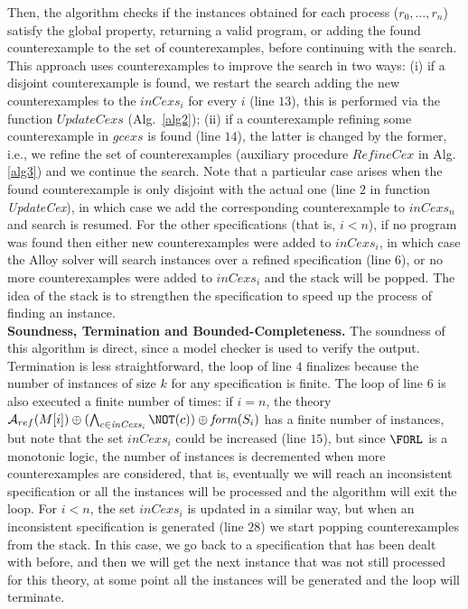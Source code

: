 	 Then,  the algorithm checks if the instances obtained for each process ($r_0,\dots,r_n$) satisfy the global property, returning a valid program, or adding the found counterexample to the set of counterexamples, before continuing with the search. This approach uses counterexamples to improve the search in two ways: (i) if a disjoint counterexample is found, we restart the search adding the new counterexamples to the $\mathit{inCexs_i}$ for every $i$ (line $13$), this is performed via the function $\mathit{UpdateCexs}$ (Alg.~\ref{alg2}); (ii) if a counterexample refining some counterexample in $\mathit{gcexs}$ is found (line $14$), the latter is changed by the former, i.e., we refine the set of counterexamples (auxiliary procedure $\mathit{RefineCex}$ in Alg.\ref{alg3}) and we continue the search.  
	 Note that a particular case arises when the found counterexample is only disjoint with the actual one (line $2$ in function \textit{UpdateCex}), in which case we add the corresponding counterexample to $\mathit{inCexs}_n$ and search is resumed. For the other specifications (that is, $i<n$), if no program was found then either new counterexamples were added to $\mathit{inCexs_i}$, in which case the Alloy solver will search instances over a refined specification (line $6$), or no more counterexamples were added to $\mathit{inCexs}_i$ and the stack will be popped. The idea of the stack is to strengthen the specification to speed up the process of finding an instance.\\
\noindent \textbf{Soundness, Termination and Bounded-Completeness.}
The soundness of this algorithm is direct, since a model checker is used to verify the output. Termination is less straightforward, the loop of line $4$ finalizes because the number of instances of size $k$ for any specification is finite. The loop of line $6$ is also executed a finite number of times: if $i=n$, the theory $\mathcal{A}_{ref}(M[i])\oplus (\bigwedge_{c \in \mathit{inCexs}_i} \NOT(c)) \oplus \mathit{form}(S_i)$ has a finite number of instances, but note that the set $\mathit{inCexs}_i$ could be increased (line $15$), but since ${\FORL}$ is a monotonic logic,  the number of instances is decremented when more counterexamples are considered, that is, eventually we will reach an inconsistent specification or all the instances will be processed and the algorithm will exit the loop. For $i<n$,  the set $\mathit{inCexs}_i$ is updated in a similar way, but when an inconsistent specification is generated (line $28$) we start popping  counterexamples from the stack. In this case, we go back to a specification that has been dealt with before, and then we will get the next instance that was not still processed for this theory, at some point all the instances will be generated and the loop will terminate. 
 
